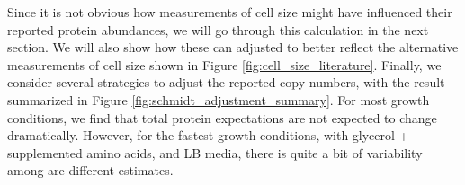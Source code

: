 \begin{figure}
\end{figure}

Since it is not obvious how measurements of cell size might have influenced
their reported protein abundances, we will go through this calculation in the
next section. We will also show how these can adjusted to better reflect the
alternative measurements of cell size shown in Figure
\ref{fig:cell_size_literature}. Finally, we consider several strategies to
adjust the reported copy numbers, with the result summarized in Figure
\ref{fig:schmidt_adjustment_summary}. For most growth conditions, we find that
total protein expectations are not expected to change dramatically. However, for
the fastest growth conditions, with glycerol + supplemented amino acids, and LB
media, there is quite a bit of variability among are different estimates.



%

